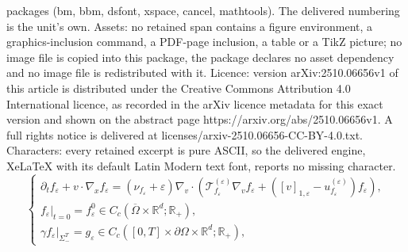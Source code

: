 \documentclass[10pt,a4paper]{amsart}
\newcommand{\R}{\mathbb{R}}
\newcommand{\calT}{\mathcal T}
\newcommand{\lt}{\left}
\newcommand{\p}{\partial}
\newcommand{\renorm}[3]{\lt[#1\rt]_{#2 , #3}}
\newcommand{\rt}{\right}
\newcommand{\ve}{\varepsilon}
\begin{document}
packages (bm, bbm, dsfont, xspace, cancel, mathtools). The delivered numbering is the unit's own. Assets: no retained span contains a figure environment, a graphics-inclusion command, a PDF-page inclusion, a table or a TikZ picture; no image file is copied into this package, the package declares no asset dependency and no image file is redistributed with it. Licence: version arXiv:2510.06656v1 of this article is distributed under the Creative Commons Attribution 4.0 International licence, as recorded in the arXiv licence metadata for this exact version and shown on the abstract page https://arxiv.org/abs/2510.06656v1. A full rights notice is delivered at licenses/arxiv-2510.06656-CC-BY-4.0.txt. Characters: every retained excerpt is pure ASCII, so the delivered engine, XeLaTeX with its default Latin Modern text font, reports no missing character.
\begin{equation}\label{eq: reg}
    \begin{cases}
        \p_t f_\ve + v\cdot \nabla_x f_\ve = \left(\nu_{f_\ve} +  \ve\right) \nabla_v\cdot \left( \calT_{f_\ve}^{(\ve)} \nabla_v f_\ve +  (\renorm{v}{1}{\ve} - u_{f_\ve}^{(\ve)}) f_\ve \right), \\
        f_\ve|_{t=0} = f_\ve^0 \in C_c(\overline{\Omega}\times\R^d;\R_+), \\
        \gamma f_{\ve}|_{\Sigma_-^T} = g_\ve \in C_c([0,T]\times \p\Omega \times \R^d; \R_+),
    \end{cases}
\end{equation}
\end{document}
